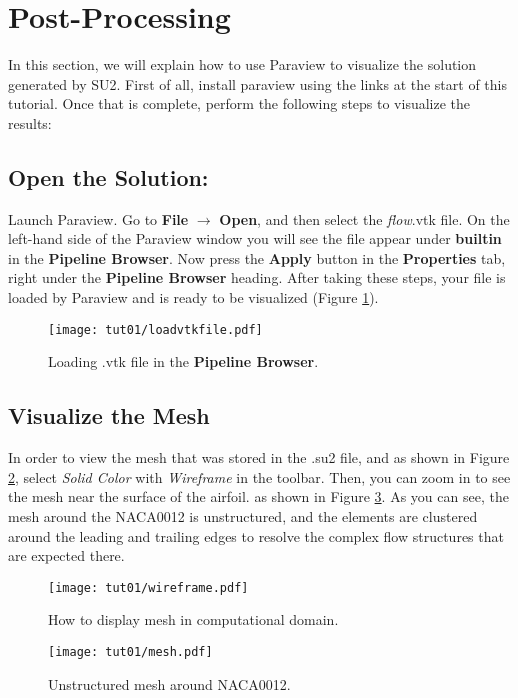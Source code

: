 \section{Post-Processing}
In this section, we will explain how to use Paraview to visualize the solution generated by SU2. First of all, install paraview using the links at the start of this tutorial. Once that is complete, perform the following steps to visualize the results:
\subsection{Open the Solution:}
Launch Paraview. Go to \textbf{File} $\rightarrow$ \textbf{Open}, and then select the \textit{flow}.vtk file. On the left-hand side of the Paraview window you will see the file appear under \textbf{builtin} in the \textbf{Pipeline Browser}. Now press the \textbf{Apply} button in the \textbf{Properties} tab, right under the \textbf{Pipeline Browser} heading. After taking these steps, your file is loaded by Paraview and is ready to be visualized (Figure \ref{fig1:load}).
\begin{figure}[htbp]
    \centering
    \texttt{[image: tut01/loadvtkfile.pdf]}
    \caption{Loading .vtk file in the \textbf{Pipeline Browser}.}
    \label{fig1:load}
\end{figure}
\subsection{Visualize the Mesh}
In order to view the mesh that was stored in the .su2 file, and as shown in Figure \ref{fig1:wireframe}, select \textit{Solid Color} with \textit{Wireframe} in the toolbar. Then, you can zoom in to see the mesh near the surface of the airfoil. as shown in Figure \ref{fig1:mesh}. As you can see, the mesh around the NACA0012 is unstructured, and the elements are clustered around the leading and trailing edges to resolve the complex flow structures that are expected there.
\begin{figure}[htbp]
    \centering
    \texttt{[image: tut01/wireframe.pdf]}
    \caption{How to display mesh in computational domain.}
    \label{fig1:wireframe}
\end{figure}
\begin{figure}[htbp]
    \centering
    \texttt{[image: tut01/mesh.pdf]}
    \caption{Unstructured mesh around NACA0012.}
    \label{fig1:mesh}
\end{figure}
